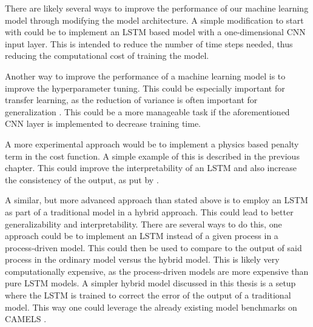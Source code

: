 There are likely several ways to improve the performance of our machine learning 
model through modifying the model architecture. A simple modification to start with 
could be to implement an LSTM based model with a one-dimensional CNN input layer. 
This is intended to reduce the number of time steps needed, thus reducing the 
computational cost of training the model.

Another way to improve the performance of a machine learning model is to improve 
the hyperparameter tuning. This could be especially important 
for transfer learning, as the reduction of variance is often important for 
generalization \citep{elemstatlearn}. This could be a more manageable task if 
the aforementioned CNN layer is implemented to decrease training time.

A more experimental approach would be to implement a physics based penalty term 
in the cost function. A simple example of 
this is described in the previous chapter. This could improve the interpretability 
of an LSTM and also increase the consistency of the output, as put by \citet{hybrid_paper}.

A similar, but more advanced approach than stated above is to employ an LSTM as 
part of a traditional model in a hybrid approach. This could lead to better generalizability and 
interpretability. There are several ways to do this, one approach could be to implement 
an LSTM instead of a given process in a process-driven model. This could 
then be used to compare to the output of said process in the ordinary model versus 
the hybrid model. This is likely very computationally expensive, as the process-driven 
models are more expensive than pure LSTM models. A simpler hybrid model discussed 
in this thesis is a setup where the LSTM is trained to correct the error of 
the output of a traditional model. This way one could leverage the already existing 
model benchmarks on CAMELS \citep{CAMELS_hydroshare}.

\begin{comment}
One should also look into the possibility of implementing LSTM models in Statkraft's 
Shyft\citep{Shyft}, making it much easier to employ these models on many datasets, 
as well as greatly simplifying the process of comparing with other models.
\end{comment}
